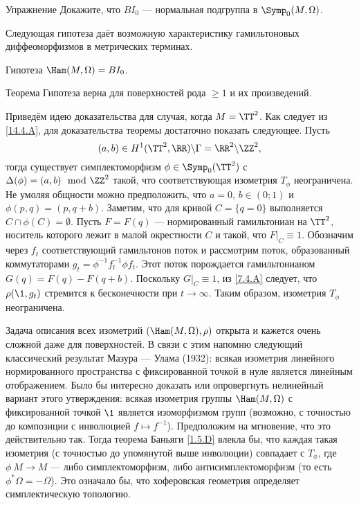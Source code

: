\begin{ex}{Упражнение}\label{14.4.A}
Докажите, что $BI_0$ --- нормальная подгруппа в $\Symp_0(M,\Omega)$.
\end{ex}

Следующая гипотеза даёт возможную характеристику гамильтоновых диффеоморфизмов в метрических терминах.

\begin{ex*}{Гипотеза}
$\Ham(M,\Omega) = BI_0$.
\end{ex*}

\begin{thm}[(\cite{LP})]{Теорема}\label{14.4.B}
Гипотеза верна для поверхностей рода $\ge1$ и их произведений.
\end{thm}

Приведём идею доказательства для случая, когда $M=\TT^2$.
Как следует из \ref{14.4.A}, для доказательства теоремы достаточно показать следующее.
Пусть
\[(a,b)\in H^1(\TT^2,\RR)\backslash\Gamma=\RR^2\backslash\ZZ^2,\]
тогда существует симплектоморфизм $\phi\in\Symp_0(\TT^2)$ с $\Delta (\phi) = (a, b) \mod \ZZ^2$ такой, что соответствующая изометрия $T_\phi$ неограничена.
Не умоляя общности можно предположить, что $a= 0$, $b \in (0; 1)$ и $\phi(p, q) = (p, q + b)$.
Заметим, что для кривой $C = \{q = 0\}$ выполняется $C \cap \phi(C) = \emptyset$.
Пусть $F = F(q)$ --- нормированный гамильтониан на $\TT^2$, носитель которого лежит в малой окрестности $C$ и такой, что $F|_C \equiv 1$.
Обозначим через $f_t$ соответствующий гамильтонов поток и рассмотрим поток, образованный коммутаторами $g_t = \phi^{-1}f_t^{-1}\phi f_t$.
Этот поток порождается гамильтонианом $G(q) = F(q) - F(q + b)$.
Поскольку $G|_C \equiv 1$, из \ref{7.4.A} следует, что $\rho(\1, g_t)$ стремится к бесконечности при $t \to \infty$.
Таким образом, изометрия $T_\phi$ неограничена.

Задача описания всех изометрий $(\Ham(M,\Omega), \rho)$ открыта и кажется очень сложной даже для поверхностей.
В связи с этим напомню следующий классический результат Мазура --- Улама \cite{MU} (1932): всякая изометрия линейного нормированного пространства с фиксированной точкой в нуле является линейным отображением.
Было бы интересно доказать или опровергнуть нелинейный вариант этого утверждения: всякая изометрия группы $\Ham(M,\Omega)$ с фиксированной точкой $\1$ является изоморфизмом групп (возможно, с точностью до композиции с инволюцией $f\mapsto f^{-1}$).
Предположим на мгновение, что это действительно так.
Тогда теорема Баньяги \ref{1.5.D} влекла бы, что каждая такая изометрия (с точностью до упомянутой выше инволюции) совпадает с $T_\phi$, где $\phi\: M \to M$ --- либо симплектоморфизм, либо антисимплектоморфизм (то есть $\phi^\ast\Omega = -\Omega$).
Это означало бы, что хоферовская геометрия определяет симплектическую топологию.
